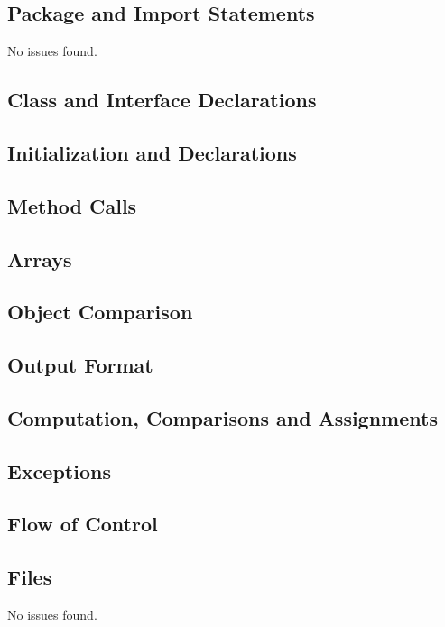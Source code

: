 \subsection{Package and Import Statements}
No issues found.

\subsection{Class and Interface Declarations}
\blindtext

\subsection{Initialization and Declarations}
\blindtext

\subsection{Method Calls}
\blindtext

\subsection{Arrays}
\blindtext

\subsection{Object Comparison}
\blindtext

\subsection{Output Format}
\blindtext

\subsection{Computation, Comparisons and Assignments}
\blindtext

\subsection{Exceptions}
\blindtext

\subsection{Flow of Control}
\blindtext

\subsection{Files}
No issues found.
